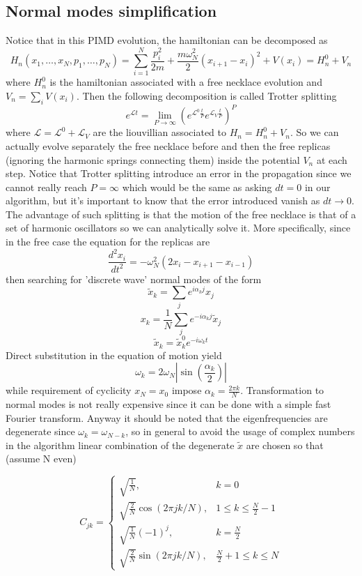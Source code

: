 \documentclass[10pt,a4paper]{article}
\begin{document}
\subsection{Normal modes simplification}
Notice that in this PIMD evolution, the hamiltonian can be decomposed as
\[ H_n(x_1,\dots,x_N,p_1,\dots,p_N)= \sum_{i=1}^{N}\frac{ p_i^2}{2m} + \frac{m\omega_N^2}{2}(x_{i+1}-x_i)^2+V(x_i) = H_n^0 + V_n \]
where $H_n^0$ is the hamiltonian associated with a free necklace evolution and $V_n= \sum_i V(x_i)$.
Then the following decomposition is called Trotter splitting
\[ e^{\mathcal{L}t} = \lim\limits_{P\rightarrow \infty} (e^{\mathcal{L}^0\frac{t}{P}} e^{\mathcal{L}_V\frac{t}{P}})^{P} \]
where $\mathcal{L}=\mathcal{L}^0+\mathcal{L}_V$ are the liouvillian associated to $H_n = H_n^0 + V_n$.
So we can actually evolve separately the free necklace before and then the free replicas (ignoring the harmonic springs connecting them) inside the potential $V_n$ 
at each step. Notice that Trotter splitting introduce an error in the propagation since we cannot really reach $P = \infty $ which would be the same as asking $dt=0$ in our algorithm, but it's important to know that the error introduced vanish as $dt \rightarrow 0$.
The advantage of such splitting is that the motion of the free necklace is that of a set of harmonic oscillators so we can analytically solve it.
More specifically, since in the free case the equation for the replicas are
\[\frac{d^2x_i}{dt^2}= -\omega_N^2(2x_i-x_{i+1}-x_{i-1})\]
then searching for 'discrete wave' normal modes of the form 
\[\tilde{x}_k=\sum_j e^{i\alpha_kj}x_j\]
\[x_k=\frac{1}{N}\sum_j e^{-i\alpha_kj}\tilde{x}_j\]
\[\tilde{x}_k= \tilde{x}_k^0 e^{-i\omega_kt}  \]
Direct substitution in the equation of motion yield
\[ \omega_k = 2\omega_N |\sin(\frac{\alpha_k}{2})| \]
while requirement of cyclicity $x_{N}=x_0$ impose $\alpha_k = \frac{2\pi k}{N}$.
Transformation to normal modes is not really expensive since it can be done with a simple fast Fourier transform.
Anyway it should be noted that the eigenfrequencies are degenerate since $\omega_k = \omega_{N-k}$, so in general to avoid the usage of complex numbers in the algorithm linear combination of the degenerate $\tilde{x}$ are chosen so that (assume N even)

 \[
C_{jk} = \left\{\begin{array}{lr}
\sqrt{\frac{1}{N}}, & k=0\\
\sqrt{\frac{2}{N}} \cos(2\pi jk/N), & 1\leq k\leq\frac{N}{2}-1\\
\sqrt{\frac{1}{N}} (-1)^j, &  k= \frac{N}{2} \\
\sqrt{\frac{2}{N}} \sin(2\pi jk/N), &  \frac{N}{2}+1\leq k \leq N
\end{array}\right.\]
\end{document}

